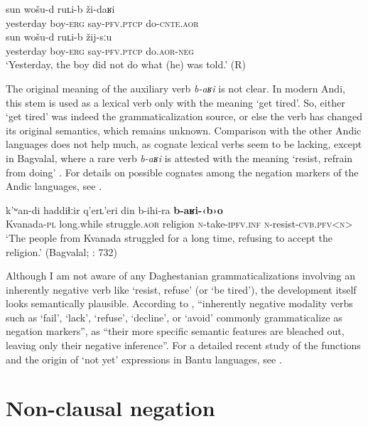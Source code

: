 \documentclass[output=paper,colorlinks=true, citecolor=brown]{langscibook}
\begin{document}
\ea\label{ex:and:44}
    \ea\label{ex:and:44a} 
        \gll sun wošu-d ruʟi-b ži-daʁi \\
              yesterday boy-\textsc{erg} say-\textsc{pfv.ptcp} do-\textsc{cnte.aor}  \\
        \glt 
    \ex\label{ex:and:44b} 
        \gll sun wošu-d ruʟi-b žij-sːu \\
              yesterday boy-\textsc{erg} say-\textsc{pfv.ptcp} do.\textsc{aor-neg} \\
        \glt  ‘Yesterday, the boy did not do what (he) was told.’ (R)
    \z 
\z 

The original meaning of the auxiliary verb \textit{b\nobreakdash-aʁi} is not clear. In modern Andi, this stem is used as a lexical verb only with the meaning ‘get tired’. So, either ‘get tired’ was indeed the grammaticalization source, or else the verb has changed its original semantics, which remains unknown. Comparison with the other Andic languages does not help much, as cognate lexical verbs seem to be lacking, except in Bagvalal, where a rare verb \textit{b\nobreakdash-aʁi} is attested with the meaning ‘resist, refrain from doing’ . For details on possible cognates among the negation markers of the Andic languages, see \citet{MaisakVerhees2024}.

\ea
    \label{ex:and:45}
    \gll k’ʷan-di haddiɬːir q’erʟ’eri din b-ihi-ra \textbf{b-aʁi-‹b›o} \\
          Kvanada-\textsc{pl} long.while struggle.\textsc{aor} religion \textsc{n}{}-take-\textsc{ipfv.inf} \textsc{n}{}-resist-\textsc{cvb.pfv<n}> \\
    \glt ‘The people from Kvanada struggled for a long time, refusing to accept the religion.’ (Bagvalal; \citealt{KibrikEtAl2001}: 732)
\z 

Although I am not aware of any Daghestanian grammaticalizations involving an inherently negative verb like ‘resist, refuse’ (or ‘be tired’), the development itself looks semantically plausible. According to \citet[382--383]{Givón2001}, “inherently negative modality verbs such as ‘fail’, ‘lack’, ‘refuse’, ‘decline’, or ‘avoid’ commonly grammaticalize as negation markers”, as “their more specific semantic features are bleached out, leaving only their negative inference”. For a detailed recent study of the functions and the origin of ‘not yet’ expressions in Bantu languages, see \citet{VeselinovaDevos2021}.

\section{Non-clausal negation} \label{sec:and:3}
\end{document}
